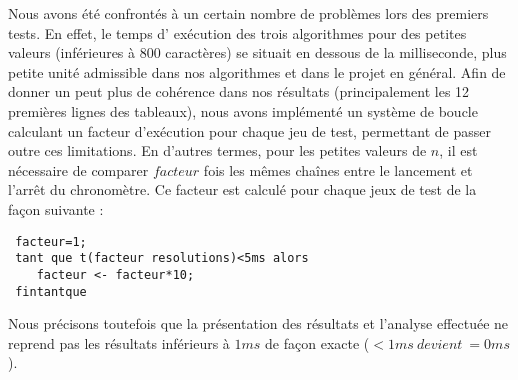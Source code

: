 Nous avons été confrontés à un certain nombre de problèmes lors des premiers tests. En effet, le temps d’ exécution des trois algorithmes pour des petites valeurs (inférieures à 800 caractères) se situait en dessous de la milliseconde, plus petite unité admissible dans nos algorithmes et dans le projet en général.
Afin de donner un peut plus de cohérence dans nos résultats (principalement les 12 premières lignes des tableaux), nous avons implémenté un système de boucle calculant un facteur d'exécution pour chaque jeu de test, permettant de passer outre ces limitations.
En d'autres termes, pour les petites valeurs de $n$, il est nécessaire de comparer $facteur$ fois les mêmes chaînes entre le lancement et l'arrêt du chronomètre. Ce facteur est calculé pour chaque jeux de test de la façon suivante :
\begin{lstlisting}
 facteur=1;
 tant que t(facteur resolutions)<5ms alors
    facteur <- facteur*10;
 fintantque
\end{lstlisting}

Nous précisons toutefois que la présentation des résultats et l'analyse effectuée ne reprend pas les résultats inférieurs à $1ms$ de façon exacte ($<1ms\ devient\ =0ms$).